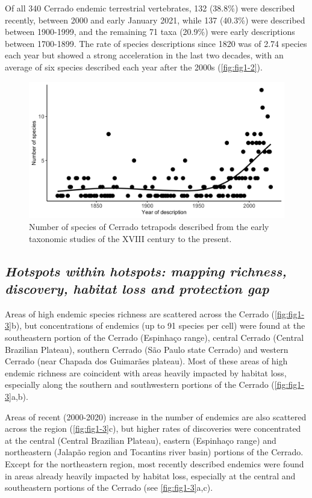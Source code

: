 \documentclass[12pt,openright,oneside,a4paper,english]{abntex2}
\begin{document}
Of all 340 Cerrado endemic terrestrial vertebrates, 132 (38.8\%) were described recently, between 2000 and early January 2021, while 137 (40.3\%) were described between 1900-1999, and the remaining 71 taxa (20.9\%) were early descriptions between 1700-1899. The rate of species descriptions since 1820 was of 2.74 species each year but showed a strong acceleration in the last two decades, with an average of six species described each year after the 2000s (\autoref{fig:fig1-2}).

\begin{figure}[htb]
	\centering
	\includegraphics[width=160mm]{Fig c1-2}
	\caption[Number of species described throughout time]{\small Number of species of Cerrado tetrapods described from the early taxonomic studies of the XVIII century to the present.}
	\label{fig:fig1-2}
\end{figure}

\subsection{\textit{Hotspots within hotspots: mapping richness, discovery, habitat loss and protection gap}}

Areas of high endemic species richness are scattered across the Cerrado (\autoref{fig:fig1-3}b), but concentrations of endemics (up to 91 species per cell) were found at the southeastern portion of the Cerrado (Espinhaço range), central Cerrado (Central Brazilian Plateau), southern Cerrado (São Paulo state Cerrado) and western Cerrado (near Chapada dos Guimarães plateau). Most of these areas of high endemic richness are coincident with areas heavily impacted by habitat loss, especially along the southern and southwestern portions of the Cerrado (\autoref{fig:fig1-3}a,b).

Areas of recent (2000-2020) increase in the number of endemics are also scattered across the region (\autoref{fig:fig1-3}c), but higher rates of discoveries were concentrated at the central (Central Brazilian Plateau), eastern (Espinhaço range) and northeastern (Jalapão region and Tocantins river basin) portions of the Cerrado. Except for the northeastern region, most recently described endemics were found in areas already heavily impacted by habitat loss, especially at the central and southeastern portions of the Cerrado (see \autoref{fig:fig1-3}a,c).
\end{document}
